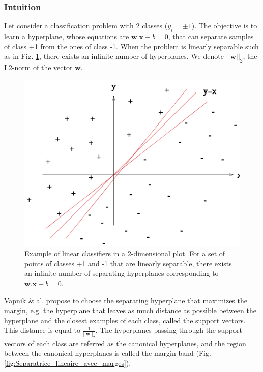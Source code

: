 \subsubsection{Intuition}
Let consider a classification problem with 2 classes ($y_i= \pm 1$). The objective is to learn a hyperplane, whose equations are $\textbf{w}. \textbf{x} + b = 0$, that can separate samples of class +1 from the ones of class -1. When the problem is linearly separable such as in Fig. \ref{fig:Plusieurs_separatrice_lineaire}, there exists an infinite number of hyperplanes. We denote $||\textbf{w}||_2$, the L2-norm of the vector $\textbf{w}$.

\begin{figure}[h!]
\centering
\includegraphics[width=0.7\linewidth]{images/Plusieurs_separatrice_lineaire}
\caption{Example of linear classifiers in a 2-dimensional plot. For a set of points of classes +1 and -1 that are linearly separable, there exists an infinite number of separating hyperplanes corresponding to $\textbf{w}.\textbf{x} + b = 0.$}
\label{fig:Plusieurs_separatrice_lineaire}
\end{figure}

\noindent Vapnik \& al. \cite{Cortes1995} propose to choose the separating hyperplane that maximizes the margin, e.g. the hyperplane that leaves as much distance as possible between the hyperplane and the closest examples of each class, called the support vectors. This distance is equal to $\frac{1}{||\textbf{w}||_2}$. The hyperplanes passing through the support vectors of each class are referred as the canonical hyperplanes, and the region between the canonical hyperplanes is called the margin band (Fig. \ref{fig:Separatrice_lineaire_avec_marges}).

